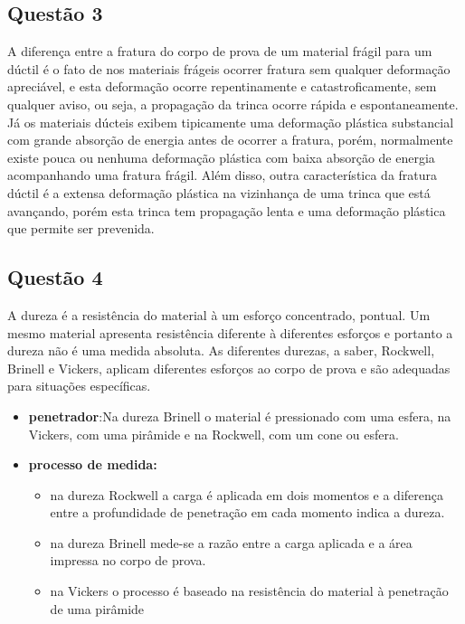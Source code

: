 \documentclass[journal]{IEEEtran}
\begin{document}
\subsection*{Questão 3}

A diferença entre a fratura do corpo de prova de um material frágil 
para um dúctil é o fato de nos materiais frágeis ocorrer fratura sem 
qualquer deformação apreciável, e esta deformação ocorre 
repentinamente e catastroficamente, sem qualquer aviso, ou seja, a 
propagação da trinca ocorre rápida e espontaneamente. Já os materiais 
dúcteis exibem tipicamente uma deformação plástica substancial com 
grande absorção de energia antes de ocorrer a fratura, porém, 
normalmente existe pouca ou nenhuma deformação plástica com baixa 
absorção de energia acompanhando uma fratura frágil. Além disso, outra 
característica da fratura dúctil é a extensa deformação plástica na 
vizinhança de uma trinca que está avançando, porém esta trinca tem 
propagação lenta e uma deformação plástica que permite ser prevenida.
\subsection*{Questão 4}

A dureza é a resistência do material à um esforço concentrado, 
pontual. Um mesmo material
apresenta resistência diferente à diferentes esforços e portanto a 
dureza não é uma medida absoluta. 
As diferentes durezas, a saber, Rockwell, Brinell e Vickers, aplicam 
diferentes esforços ao corpo de prova e são adequadas para situações
específicas.

\begin{itemize}
 \item \textbf{penetrador}:Na dureza Brinell o material é pressionado 
com uma esfera, na Vickers,
com uma pirâmide e na Rockwell, com um cone ou esfera. 
 \item \textbf{processo de medida:}
 \begin{itemize}
  \item  na dureza Rockwell a carga é 
aplicada em dois momentos e a diferença entre a profundidade de 
penetração em cada momento indica a dureza. 
\item na dureza Brinell mede-se a razão entre a carga aplicada e a 
área impressa no corpo de prova.
\item na Vickers o processo é baseado na resistência do material à 
penetração de uma pirâmide
 \end{itemize}

\end{itemize}
\end{document}

